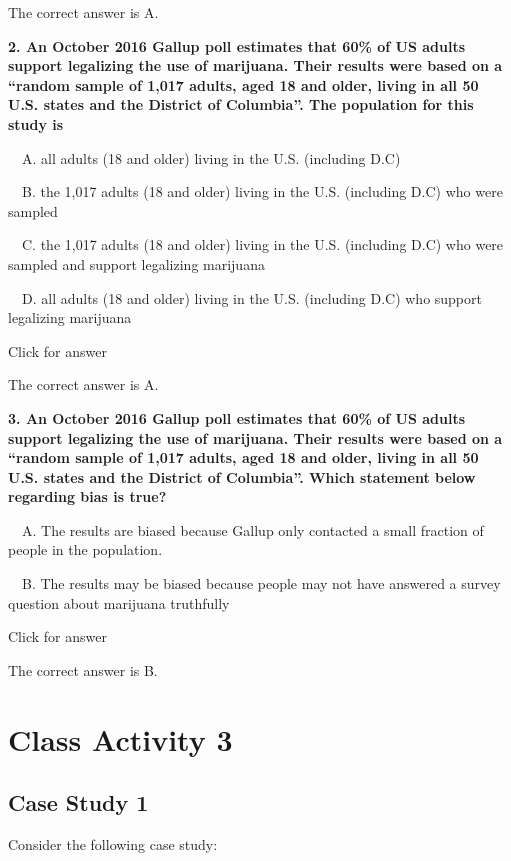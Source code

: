 \documentclass[
]{book}
\begin{document}
The correct answer is A.

\textbf{2. An October 2016 Gallup poll estimates that 60\% of US adults support legalizing the use of marijuana. Their results were based on a ``random sample of 1,017 adults, aged 18 and older, living in all 50 U.S. states and the District of Columbia''. The population for this study is}

 A. all adults (18 and older) living in the U.S. (including D.C)

 B. the 1,017 adults (18 and older) living in the U.S. (including D.C) who were sampled

 C. the 1,017 adults (18 and older) living in the U.S. (including D.C) who were sampled and support legalizing marijuana

 D. all adults (18 and older) living in the U.S. (including D.C) who support legalizing marijuana

Click for answer

The correct answer is A.

\textbf{3. An October 2016 Gallup poll estimates that 60\% of US adults support legalizing the use of marijuana. Their results were based on a ``random sample of 1,017 adults, aged 18 and older, living in all 50 U.S. states and the District of Columbia''. Which statement below regarding bias is true?}

 A. The results are biased because Gallup only contacted a small fraction of people in the population.

 B. The results may be biased because people may not have answered a survey question about marijuana truthfully

Click for answer

The correct answer is B.

\hypertarget{class-activity-3}{%
\chapter{Class Activity 3}\label{class-activity-3}}

\hypertarget{case-study-1}{%
\section{Case Study 1}\label{case-study-1}}

Consider the following case study:
\end{document}
